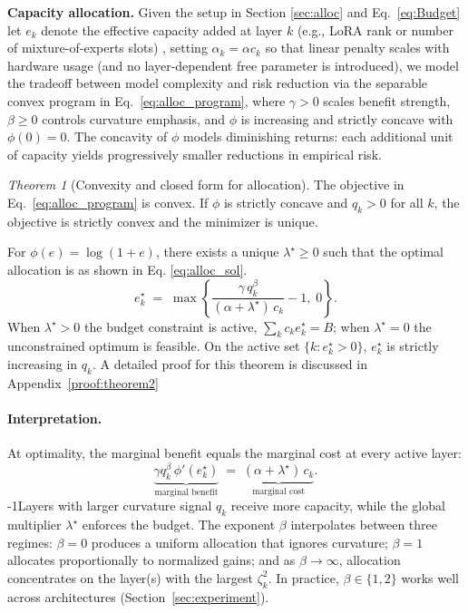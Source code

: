 \documentclass[accepted]{uai2026}%
\theoremstyle{remark}%
\newtheorem{theorem}{Theorem}
\begin{document}
\textbf{Capacity allocation.}
Given the setup in Section \ref{sec:alloc} and Eq.~\eqref{eq:Budget} let $e_k$ denote the effective capacity added at layer $k$
(e.g., LoRA rank or number of mixture-of-experts slots) \citep{capacityOfNN},
setting $\alpha_k = \alpha c_k$ so that linear penalty scales with
hardware usage (and no layer-dependent free parameter is introduced),
we model the tradeoff between model complexity and risk reduction
via the separable convex program in Eq.~\eqref{eq:alloc_program},
where $\gamma > 0$ scales benefit strength,
$\beta \ge 0$ controls curvature emphasis,
and $\phi$ is increasing and strictly concave with $\phi(0)=0$.
The concavity of $\phi$ models diminishing returns:
each additional unit of capacity yields progressively smaller
reductions in empirical risk.

\begin{theorem}[Convexity and closed form for allocation]
\label{thm:alloc}
The objective in Eq.~\eqref{eq:alloc_program} is convex.
If $\phi$ is strictly concave and $q_k > 0$ for all $k$,
the objective is strictly convex and the minimizer is unique.

For $\phi(e) = \log(1+e)$, there exists a unique $\lambda^{\star} \ge 0$
such that the optimal allocation is as shown in Eq. \eqref{eq:alloc_sol}.
\begin{equation}
  \label{eq:alloc_sol}
  \boxed{
  e_k^{\star}
  \;=\;
  \max\!\left\{
    \frac{\gamma\,q_k^{\beta}}{(\alpha + \lambda^{\star})\,c_k}
    - 1,\;
    0
  \right\}.
  }
\end{equation}
When $\lambda^{\star} > 0$ the budget constraint is active,
$\sum_k c_k e_k^{\star} = B$;
when $\lambda^{\star} = 0$ the unconstrained optimum is feasible.
On the active set $\{k : e_k^{\star} > 0\}$,
$e_k^{\star}$ is strictly increasing in $q_k$. A detailed proof for this theorem is discussed in Appendix~\ref{proof:theorem2}
\end{theorem}

\paragraph{Interpretation.}
At optimality, the marginal benefit equals the marginal cost at every
active layer:
\[
  \underbrace{\gamma q_k^{\beta}\,\phi'(e_k^{\star})}_{\text{marginal benefit}}
  \;=\;
  \underbrace{(\alpha + \lambda^{\star})\,c_k}_{\text{marginal cost}}.
\]
\looseness-1Layers with larger curvature signal $q_k$ receive more capacity,
while the global multiplier $\lambda^{\star}$ enforces the budget.
The exponent $\beta$ interpolates between three regimes:
$\beta = 0$ produces a uniform allocation that ignores curvature;
$\beta = 1$ allocates proportionally to normalized gains;
and as $\beta \to \infty$, allocation concentrates on the layer(s) with
the largest $\zeta_k^{2}$.
In practice, $\beta \in \{1, 2\}$ works well across architectures
(Section~\ref{sec:experiment}).
\end{document}
